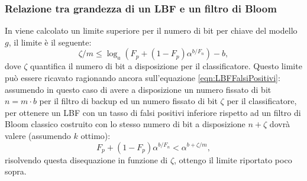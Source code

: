 \documentclass[../../main.tex]{subfiles}
\begin{document}
    \subsubsection{Relazione tra grandezza di un LBF e un filtro di Bloom}
    In \cite{10.5555/3326943.3326986} viene calcolato un limite superiore per il numero di bit per chiave del modello $g$, il limite è il seguente: 
    \begin{equation}
        \zeta/m \leq \log_a \left(F_p + (1 - F_p)\alpha^{b/F_n}\right) - b,
    \end{equation}
    dove $\zeta$ quantifica il numero di bit a disposizione per il classificatore. Questo limite può essere ricavato ragionando ancora sull'equazione \ref{eqn:LBFFalsiPositivi}: assumendo in questo caso di avere a disposizione un numero fissato di bit $n = m \cdot b$  per il filtro di backup ed un numero fissato di bit $\zeta$ per il classificatore, per ottenere un LBF con un tasso di falsi positivi inferiore rispetto ad un filtro di Bloom classico costruito con lo stesso numero di bit a disposizione $n + \zeta$ dovrà valere (assumendo $k$ ottimo): 
    \[F_p + (1 - F_p)\alpha^{b/F_n} < \alpha^{b + \zeta/m},\]
    risolvendo questa disequazione in funzione di $\zeta$, ottengo il limite riportato poco sopra.
\end{document}

